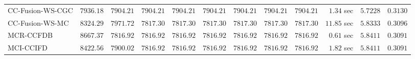 \begin{table}[H]
\begin{tabular}{lrrrrrrrrrrr}
    CC-Fusion-WS-CGC & $      7936.18$ & $      7904.21$ & $      7904.21$ & $      7904.21$ & $      7904.21$ & $      7904.21$ & $      7904.21$ & $      7904.21$ & $         1.34$ sec    & $       5.7228$  & $       0.3130$ \\ 
     CC-Fusion-WS-MC & $      8324.29$ & $      7971.72$ & $      7817.30$ & $      7817.30$ & $      7817.30$ & $      7817.30$ & $      7817.30$ & $      7817.30$ & $        11.85$ sec    & $       5.8333$  & $       0.3096$ \\ 
\cmidrule{1-1} 
           MCR-CCFDB & $      8667.37$ & $      7816.92$ & $      7816.92$ & $      7816.92$ & $      7816.92$ & $      7816.92$ & $      7816.92$ & $      7816.92$ & $         0.61$ sec    & $       5.8411$  & $       0.3091$ \\ 
\cmidrule{1-1} 
           MCI-CCIFD & $      8422.56$ & $      7900.02$ & $      7816.92$ & $      7816.92$ & $      7816.92$ & $      7816.92$ & $      7816.92$ & $      7816.92$ & $         1.82$ sec    & $       5.8411$  & $       0.3091$ \\ 
\bottomrule
\end{tabular}
\end{table}

